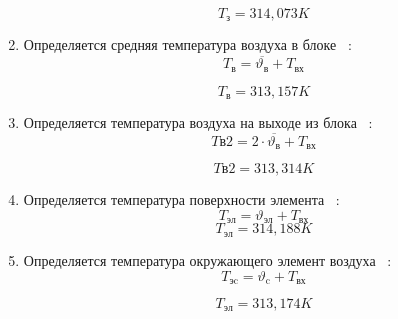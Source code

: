 \begin{enumerate}[label={\arabic*.}]
  $$T\mathrm{_{з}} = 314,073K$$
  
\item Определяется средняя температура воздуха в блоке ~\cite{Rotkop1976}:
  \begin{equation}
    T\mathrm{_{в}} = \overline{\vartheta\mathrm{_{в}}} + T\mathrm{_{вх}}
  \end{equation}
  
  $$ T\mathrm{_{в}} = 313,157K$$
 
\item Определяется температура воздуха на выходе из
  блока ~\cite{Rotkop1976}:
  \begin{equation}
    T\mathrm{в2} = 2\cdot \overline{\vartheta\mathrm{_{в}}} + T\mathrm{_{вх}}
  \end{equation}
  
  $$ T\mathrm{в2} = 313,314K$$
  
\item Определяется температура поверхности элемента ~\cite{Rotkop1976}:
  \begin{equation}
    T\mathrm{_{эл}} = \vartheta\mathrm{_{эл}}  + T\mathrm{_{вх}}
  \end{equation}
  $$    T\mathrm{_{эл}} = 314,188K$$
  
\item Определяется температура окружающего
  элемент воздуха ~\cite{Rotkop1976}:
  \begin{equation}
        T\mathrm{_{эc}} = \vartheta\mathrm{_{c}} + T\mathrm{_{вх}}
    \end{equation}

 $$    T\mathrm{_{эл}} = 313,174K$$

  
\end{enumerate}
\newpage %
